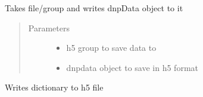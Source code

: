 \documentclass[letterpaper,10pt,english]{sphinxmanual}
\begin{document}
\begin{fulllineitems}
\label{\detokenize{dnpImport:dnpLab.dnpImport.h5.write_dnpdata}}
Takes file/group and writes dnpData object to it
\begin{quote}\begin{description}
\item[{Parameters}] \leavevmode\begin{itemize}
\item {} 
 \sphinxhyphen{}\sphinxhyphen{} h5 group to save data to

\item {} 
 \sphinxhyphen{}\sphinxhyphen{} dnpdata object to save in h5 format

\end{itemize}

\end{description}\end{quote}

\end{fulllineitems}


\begin{fulllineitems}
\label{\detokenize{dnpImport:dnpLab.dnpImport.h5.write_dict}}
Writes dictionary to h5 file

\end{fulllineitems}

\end{document}
